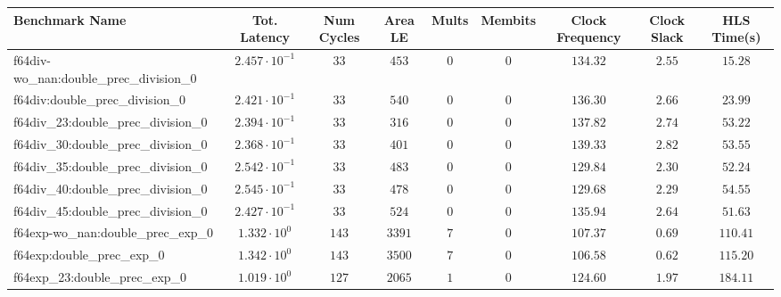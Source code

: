 \begin{tabular}{|l|c|c|c|c|c|c|c|c|}
\hline
Benchmark Name                                 & Tot. Latency            & Num Cycles & Area LE   & Mults   & Membits    & Clock Frequency & Clock Slack & HLS Time(s) \\
\hline
f64div-wo\_nan:double\_prec\_division\_0       & $ 2.457 \cdot 10^{-1} $ & $ 33     $ & $ 453   $ & $ 0   $ & $ 0      $ & $ 134.32      $ & $ 2.55    $ & $ 15.28   $ \\
f64div:double\_prec\_division\_0               & $ 2.421 \cdot 10^{-1} $ & $ 33     $ & $ 540   $ & $ 0   $ & $ 0      $ & $ 136.30      $ & $ 2.66    $ & $ 23.99   $ \\
f64div\_23:double\_prec\_division\_0           & $ 2.394 \cdot 10^{-1} $ & $ 33     $ & $ 316   $ & $ 0   $ & $ 0      $ & $ 137.82      $ & $ 2.74    $ & $ 53.22   $ \\
f64div\_30:double\_prec\_division\_0           & $ 2.368 \cdot 10^{-1} $ & $ 33     $ & $ 401   $ & $ 0   $ & $ 0      $ & $ 139.33      $ & $ 2.82    $ & $ 53.55   $ \\
f64div\_35:double\_prec\_division\_0           & $ 2.542 \cdot 10^{-1} $ & $ 33     $ & $ 483   $ & $ 0   $ & $ 0      $ & $ 129.84      $ & $ 2.30    $ & $ 52.24   $ \\
f64div\_40:double\_prec\_division\_0           & $ 2.545 \cdot 10^{-1} $ & $ 33     $ & $ 478   $ & $ 0   $ & $ 0      $ & $ 129.68      $ & $ 2.29    $ & $ 54.55   $ \\
f64div\_45:double\_prec\_division\_0           & $ 2.427 \cdot 10^{-1} $ & $ 33     $ & $ 524   $ & $ 0   $ & $ 0      $ & $ 135.94      $ & $ 2.64    $ & $ 51.63   $ \\
f64exp-wo\_nan:double\_prec\_exp\_0            & $ 1.332 \cdot 10^{0}  $ & $ 143    $ & $ 3391  $ & $ 7   $ & $ 0      $ & $ 107.37      $ & $ 0.69    $ & $ 110.41  $ \\
f64exp:double\_prec\_exp\_0                    & $ 1.342 \cdot 10^{0}  $ & $ 143    $ & $ 3500  $ & $ 7   $ & $ 0      $ & $ 106.58      $ & $ 0.62    $ & $ 115.20  $ \\
f64exp\_23:double\_prec\_exp\_0                & $ 1.019 \cdot 10^{0}  $ & $ 127    $ & $ 2065  $ & $ 1   $ & $ 0      $ & $ 124.60      $ & $ 1.97    $ & $ 184.11  $ \\

\end{tabular}
